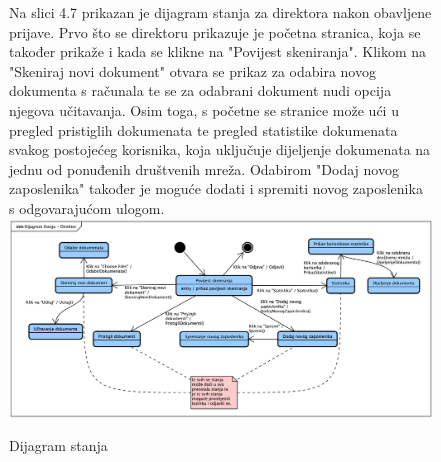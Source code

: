 			\begin{figure}[H]
				Na slici 4.7 prikazan je dijagram stanja za direktora nakon obavljene prijave. Prvo što se direktoru prikazuje je početna stranica, koja se također
				prikaže i kada se klikne na "Povijest skeniranja". Klikom na "Skeniraj novi dokument" otvara se prikaz za odabira novog dokumenta s računala te se
				za odabrani dokument nudi opcija njegova učitavanja. Osim toga, s početne se stranice može ući u pregled pristiglih dokumenata te pregled statistike
				dokumenata svakog postojećeg korisnika, koja uključuje dijeljenje dokumenata na jednu od ponuđenih društvenih mreža. Odabirom "Dodaj novog zaposlenika"
				također je moguće dodati i spremiti novog zaposlenika s odgovarajućom ulogom.
				\newline
				\includegraphics[width=\textwidth]{slike/StateMachine.png}
				\caption{Dijagram stanja}
				\label{fig:StateMachine}
			\end{figure}
			
			\eject 
		
